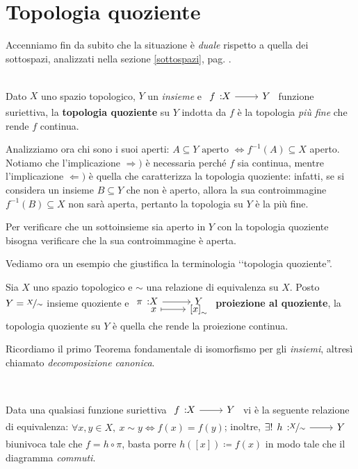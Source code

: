 \section{Topologia quoziente}
Accenniamo fin da subito che la situazione è \textit{duale} rispetto a quella dei sottospazi, analizzati nella sezione \ref{sottospazi}, pag. \pageref{sottospazi}.
\begin{define}~{}\\
	Dato $X$ uno spazio topologico, $Y$ un \textit{insieme} e $\funz f X Y$ funzione suriettiva, la \textbf{topologia quoziente} su $Y$ indotta da $f$ è la topologia \textit{più fine} che rende $f$ continua.
\end{define}
Analizziamo ora chi sono i suoi aperti: $\displaystyle A\subseteq Y \text{ aperto } \iff f^{-1}(A)\subseteq X$ aperto. Notiamo che l'implicazione $\Rightarrow)$ è necessaria perché $f$ sia continua, mentre l'implicazione $\Leftarrow)$ è quella che caratterizza la topologia quoziente: infatti, se si considera un insieme $B\subseteq Y$ che non è aperto, allora la sua controimmagine $f^{-1}(B)\subseteq X$ non sarà aperta, pertanto la topologia su $Y$ è la più fine.
\begin{tips}
	Per verificare che un sottoinsieme sia aperto in $Y$ con la topologia quoziente bisogna verificare che la sua controimmagine è aperta.
\end{tips}
Vediamo ora un esempio che giustifica la terminologia ‘‘topologia quoziente''.
\begin{example}
	Sia $X$ uno spazio topologico e $\sim$ una relazione di equivalenza su $X$. Posto $Y=\nicefrac{X}{\sim}$ insieme quoziente e $\funztot \pi X Y x {\left[x\right]_\sim}$ \textbf{proiezione al quoziente}, la topologia quoziente su $Y$ è quella che rende la proiezione continua.
\end{example}
Ricordiamo il primo Teorema fondamentale di isomorfismo per gli \textit{insiemi}, altresì chiamato \textit{decomposizione canonica}.
\begin{remember}~{}\\
	\begin{minipage}[t]{0.83\textwidth}
		Data una qualsiasi funzione suriettiva $\funz f X Y$ vi è la seguente relazione di equivalenza: $\displaystyle \forall x,y\in X, \ x\sim y \iff f(x)=f(y)$; inoltre, $\exists ! \funz h {\nicefrac{X}{\sim}} Y$ biunivoca tale che $f=h\circ\pi$, basta porre $h\left( [x] \right) \coloneqq f(x)$ in modo tale che il diagramma \textit{commuti}.
	\end{minipage}
	\begin{minipage}[t]{0.13\textwidth}\vspace{-10pt}
	\end{minipage}
\end{remember}
